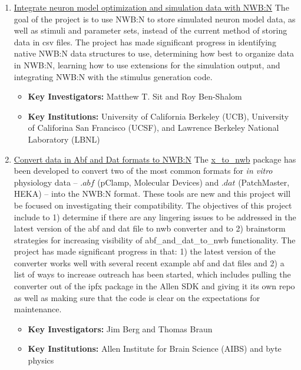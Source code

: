 \documentclass{article}
\begin{document}
\begin{enumerate}
    \item \href{https://neurodatawithoutborders.github.io/nwb_hackathons/HCK06_2019_Janelia/projects/BenderOptimization/}{Integrate neuron model optimization and simulation data with NWB:N} The goal of the project is to use NWB:N to store simulated neuron model data, as well as stimuli and parameter sets, instead of the current method of storing data in csv files. The project has made significant progress in identifying native NWB:N data structures to use, determining how best to organize data in NWB:N, learning how to use extensions for the simulation output, and integrating NWB:N with the stimulus generation code.
        \vspace{-0.2cm}
        \begin{itemize}[noitemsep]
            \item \textbf{Key Investigators:} Matthew T. Sit and Roy Ben-Shalom 
            \item \textbf{Key Institutions:} University of California Berkeley (UCB), University of Califorina San Francisco (UCSF), and Lawrence Berkeley National Laboratory (LBNL)
        \end{itemize}
        
    \item \href{https://neurodatawithoutborders.github.io/nwb_hackathons/HCK06_2019_Janelia/projects/x_to_nwb/}{Convert data in Abf and Dat formats to NWB:N} The \href{https://github.com/AllenInstitute/ipfx/tree/master/ipfx/x_to_nwb}{x\_to\_nwb} package has been developed to convert two of the most common formats for \textit{in vitro} physiology data -- $.abf$ (pClamp, Molecular Devices) and $.dat$ (PatchMaster, HEKA) -- into the NWB:N format. These tools are new and this project will be focused on investigating their compatibility. The objectives of this project include to 1) determine if there are any lingering issues to be addressed in the latest version of the abf and dat file to nwb converter and to 2) brainstorm strategies for increasing visibility of abf\_and\_dat\_to\_nwb functionality. The project has made significant progress in that: 1) the latest version of the converter works well with several recent example abf and dat files and 2) a list of ways to increase outreach has been started, which includes pulling the converter out of the ipfx package in the Allen SDK and giving it its own repo as well as making sure that the code is clear on the expectations for maintenance.
        \vspace{-0.2cm}
        \begin{itemize}[noitemsep]
            \item \textbf{Key Investigators:} Jim Berg and Thomas Braun
            \item \textbf{Key Institutions:} Allen Institute for Brain Science (AIBS) and byte physics
        \end{itemize}


\end{enumerate}
\end{document}
